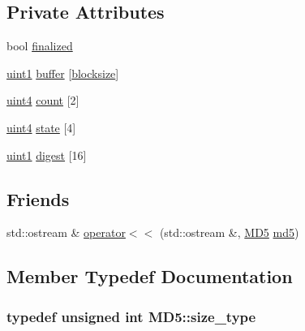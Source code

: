 \subsection*{Private Attributes}
\begin{DoxyCompactItemize}
\item 
bool \hyperlink{class_m_d5_a696e995f7045cf0146a207c720386f9c}{finalized}
\item 
\hyperlink{class_m_d5_a3b1c4901139aef256ee49c4ab14d09f9}{uint1} \hyperlink{class_m_d5_a0df603b8332399d5c1daa08ab5a315ea}{buffer} \mbox{[}\hyperlink{class_m_d5_a6126af25978be88567667fa91a6b04a9a1cc0a742ca803f75a021aef77b522963}{blocksize}\mbox{]}
\item 
\hyperlink{class_m_d5_a2e5b84a3d7db292f49873061214a0444}{uint4} \hyperlink{class_m_d5_a52a9ff26a3de9e831b17c1740aa5388a}{count} \mbox{[}2\mbox{]}
\item 
\hyperlink{class_m_d5_a2e5b84a3d7db292f49873061214a0444}{uint4} \hyperlink{class_m_d5_aae3f861952f5b129463f550170836db0}{state} \mbox{[}4\mbox{]}
\item 
\hyperlink{class_m_d5_a3b1c4901139aef256ee49c4ab14d09f9}{uint1} \hyperlink{class_m_d5_a31058e1dca10bbf29818bb5177ff02ac}{digest} \mbox{[}16\mbox{]}
\end{DoxyCompactItemize}
\subsection*{Friends}
\begin{DoxyCompactItemize}
\item 
std\+::ostream \& \hyperlink{class_m_d5_a0739666fd0f3a7117546f6c50e0783b2}{operator$<$$<$} (std\+::ostream \&, \hyperlink{class_m_d5}{M\+D5} \hyperlink{md5_8h_a92c6eed2e9b51298af559aff6792770b}{md5})
\end{DoxyCompactItemize}


\subsection{Member Typedef Documentation}
\subsubsection[{\texorpdfstring{size\+\_\+type}{size_type}}]{\setlength{\rightskip}{0pt plus 5cm}typedef unsigned int {\bf M\+D5\+::size\+\_\+type}}\hypertarget{class_m_d5_aa836972700679dbcff6ae8337f6db464}{}\label{class_m_d5_aa836972700679dbcff6ae8337f6db464}
